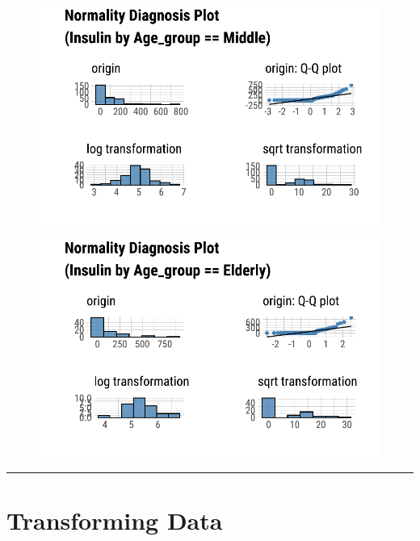 \documentclass[
  letterpaper,
  DIV=11,
  numbers=noendperiod]{scrreprt}
\begin{document}
\begin{figure}[H]

{\centering \includegraphics{./TransformingLikeDataTrans_files/figure-pdf/unnamed-chunk-6-5.pdf}

}

\end{figure}

\begin{figure}[H]

{\centering \includegraphics{./TransformingLikeDataTrans_files/figure-pdf/unnamed-chunk-6-6.pdf}

}

\end{figure}

\begin{center}\rule{0.5\linewidth}{0.5pt}\end{center}

\hypertarget{transforming-data}{%
\section{Transforming Data}\label{transforming-data}}
\end{document}
